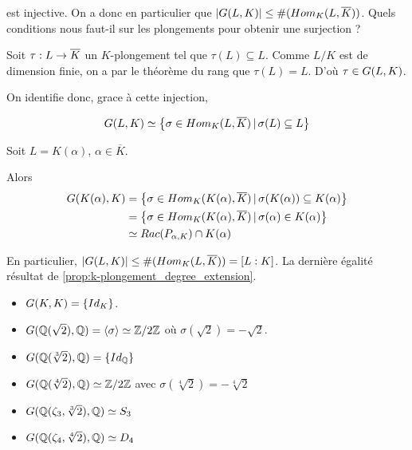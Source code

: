 est injective. On a donc en particulier que $|G(L, K)|
\leq \#(Hom_{K}(L, \overline{K}))$. Quels conditions nous faut-il
sur les plongements pour obtenir une surjection ?

Soit $\tau : L \rightarrow \overline{K}$ un $K$-plongement tel que $\tau(L)
\subseteq L$. Comme $L/K$ est de dimension finie, on a par le théorème du rang
que $\tau(L) = L$.
D'où $\tau \in G(L, K)$.

On identifie donc, grace à cette injection,

\begin{equation*}
	G(L, K) \simeq \left\{\sigma \in
	Hom_{K}(L, \overline{K}) \, | \, \sigma(L) \subseteq L \right\}
\end{equation*}

\begin{exemple}
	Soit $L = K(\alpha)$, $\alpha \in \overline{K}$.

	Alors
	\begin{align*}
		G(K(\alpha), K)
		& = \left\{\sigma \in
			Hom_{K}(K(\alpha), \overline{K}) \, | \, \sigma(K(\alpha)) \subseteq
			K(\alpha) \right\} \\
		& = \left\{\sigma \in
			Hom_{K}(K(\alpha), \overline{K}) \, | \, \sigma(\alpha) \in
			K(\alpha) \right\} \\
		& \simeq Rac(P_{\alpha, K}) \cap K(\alpha)
	\end{align*}

	En particulier, $|G(L, K)| \leq
	\#(Hom_{K}(L, \overline{K})) = [L : K]$. La
	dernière égalité résultat de \ref{prop:k-plongement_degree_extension}.
\end{exemple}

\begin{exemple} [Exercice]
	\begin{itemize}
		\item $G(K, K) = \left\{ Id_{K} \right\}$.
		\item $G(\mathbb{Q}(\sqrt{2}), \mathbb{Q}) =
			\left<\sigma\right> \simeq
			\mathbb{Z}/2\mathbb{Z}$ où $\sigma(\sqrt{2}) = - \sqrt{2}$.
		\item $G(\mathbb{Q}(\sqrt[3]{2}), \mathbb{Q}) =
			\left\{ Id_{\mathbb{Q}} \right\}$
		\item $G(\mathbb{Q}(\sqrt[4]{2}), \mathbb{Q}) \simeq
			\mathbb{Z}/2\mathbb{Z}$ avec $\sigma(\sqrt[4]{2}) = - \sqrt[4]{2}$
		\item $G(\mathbb{Q}(\zeta_{3}, \sqrt[3]{2}), \mathbb{Q})
			\simeq S_{3}$
		\item $G(\mathbb{Q}(\zeta_{4}, \sqrt[4]{2}), \mathbb{Q})
			\simeq D_{4}$
	\end{itemize}
\end{exemple}

